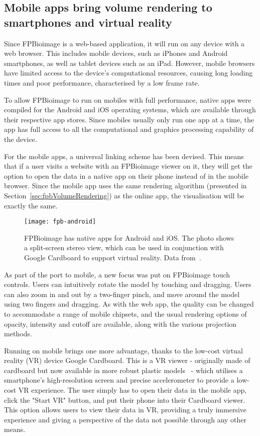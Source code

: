 \subsection{Mobile apps bring volume rendering to smartphones and virtual reality}
Since FPBioimage is a web-based application, it will run on any device with a web browser. 
This includes mobile devices, such as iPhones and Android smartphones, as well as tablet devices such as an iPad. 
However, mobile browsers have limited access to the device's computational resources, causing long loading times and poor performance, characterised by a low frame rate. 

To allow FPBioimage to run on mobiles with full performance, native apps were compiled for the Android and iOS operating systems, which are available through their respective app stores. 
Since mobiles usually only run one app at a time, the app has full access to all the computational and graphics processing capability of the device. 

For the mobile apps, a universal linking scheme has been devised. 
This means that if a user visits a website with an FPBioimage viewer on it, they will get the option to open the data in a native app on their phone instead of in the mobile browser. 
Since the mobile app uses the same rendering algorithm (presented in Section~\ref{sec:fpbVolumeRendering}) as the online app, the visualisation will be exactly the same. 

\begin{figure}[htbp!]
\centering
\texttt{[image: fpb-android]}
\caption[FPBioimage: The FPBioimage mobile app provides volumetric rendering in virtual reality]{FPBioimage has native apps for Android and iOS. The photo shows a split-screen stereo view, which can be used in conjunction with Google Cardboard\cite{cardboard} to support virtual reality. Data from~\cite{sharpe2002optical}. } %
\label{fig:fpbMobile}
\end{figure}

As part of the port to mobile, a new focus was put on FPBioimage touch controls. 
Users can intuitively rotate the model by touching and dragging. 
Users can also zoom in and out by a two-finger pinch, and move around the model using two fingers and dragging. 
As with the web app, the quality can be changed to accommodate a range of mobile chipsets, and the usual rendering options of opacity, intensity and cutoff are available, along with the various projection methods.  

Running on mobile brings one more advantage, thanks to the low-cost virtual reality (VR) device Google Cardboard\cite{cardboard}. 
This is a VR viewer - originally made of cardboard but now available in more robust plastic models~\cite{get2018cardboard} - which utilises a smartphone's high-resolution screen and precise accelerometer to provide a low-cost VR experience. 
The user simply has to open their data in the mobile app, click the "Start VR" button, and put their phone into their Cardboard viewer. 
This option allows users to view their data in VR, providing a truly immersive experience and giving a perspective of the data not possible through any other means. 

